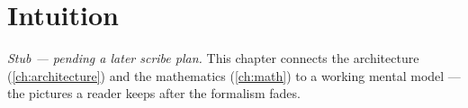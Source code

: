 \chapter{Intuition}
\label{ch:intuition}

\emph{Stub — pending a later scribe plan.} This chapter connects the architecture
(\autoref{ch:architecture}) and the mathematics (\autoref{ch:math}) to a working
mental model — the pictures a reader keeps after the formalism fades.
